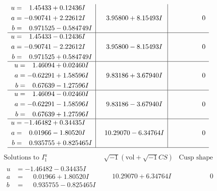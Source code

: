 \documentclass[1p]{elsarticle_modified}
\theoremstyle{definition}
\newcommand{\I}{\sqrt{-1}}
\begin{document}
$$\begin{array}{c|c|c}
\begin{aligned}
u &= \phantom{-}1.45433 + 0.12436 I \\
a &= -0.90741 + 2.22612 I \\
b &= \phantom{-}0.971525 - 0.584749 I\end{aligned}
 & \phantom{-}3.95800 + 8.15493 I & \phantom{-0.000000 } 0 \\ \hline\begin{aligned}
u &= \phantom{-}1.45433 - 0.12436 I \\
a &= -0.90741 - 2.22612 I \\
b &= \phantom{-}0.971525 + 0.584749 I\end{aligned}
 & \phantom{-}3.95800 - 8.15493 I & \phantom{-0.000000 } 0 \\ \hline\begin{aligned}
u &= \phantom{-}1.46094 + 0.02460 I \\
a &= -0.62291 + 1.58596 I \\
b &= \phantom{-}0.67639 - 1.27596 I\end{aligned}
 & \phantom{-}9.83186 + 3.67940 I & \phantom{-0.000000 } 0 \\ \hline\begin{aligned}
u &= \phantom{-}1.46094 - 0.02460 I \\
a &= -0.62291 - 1.58596 I \\
b &= \phantom{-}0.67639 + 1.27596 I\end{aligned}
 & \phantom{-}9.83186 - 3.67940 I & \phantom{-0.000000 } 0 \\ \hline\begin{aligned}
u &= -1.46482 + 0.34435 I \\
a &= \phantom{-}0.01966 - 1.80520 I \\
b &= \phantom{-}0.935755 + 0.825465 I\end{aligned}
 & \phantom{-}10.29070 - 6.34764 I & \phantom{-0.000000 } 0\\
 \hline 
 \end{array}$$\newpage$$\begin{array}{c|c|c}  
\text{Solutions to }I^u_{1}& \I (\text{vol} + \sqrt{-1}CS) & \text{Cusp shape}\\
 \hline 
\begin{aligned}
u &= -1.46482 - 0.34435 I \\
a &= \phantom{-}0.01966 + 1.80520 I \\
b &= \phantom{-}0.935755 - 0.825465 I\end{aligned}
 & \phantom{-}10.29070 + 6.34764 I & \phantom{-0.000000 } 0 \\ \hline\begin{aligned}

\end{aligned}
\end{array}$$
\end{document}
